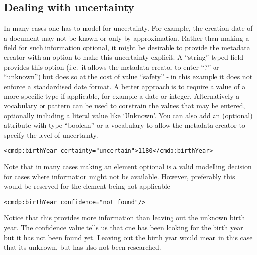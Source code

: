 \documentclass[]{article}
\date{}
\begin{document}
\subsection{Dealing with uncertainty}\label{dealing-with-uncertainty}

In many cases one has to model for uncertainty. For example, the
creation date of a document may not be known or only by approximation.
Rather than making a field for such information optional, it might be
desirable to provide the metadata creator with an option to make this
uncertainty explicit. A ``string'' typed field provides this option
(i.e.~it allows the metadata creator to enter ``?'' or ``unknown'') but
does so at the cost of value ``safety'' - in this example it does not
enforce a standardised date format. A better approach is to require a
value of a more specific type if applicable, for example a date or
integer. Alternatively a vocabulary or pattern can be used to constrain
the values that may be entered, optionally including a literal value
like `Unknown'. You can also add an (optional) attribute with type
``boolean'' or a vocabulary to allow the metadata creator to specify the
level of uncertainty.

\begin{verbatim}
<cmdp:birthYear certainty="uncertain">1180</cmdp:birthYear>
\end{verbatim}

Note that in many cases making an element optional is a valid modelling
decision for cases where information might not be available. However,
preferably this would be reserved for the element being not applicable.

\begin{verbatim}
<cmdp:birthYear confidence="not found"/>
\end{verbatim}

Notice that this provides more information than leaving out the unknown
birth year. The confidence value tells us that one has been looking for
the birth year but it has not been found yet. Leaving out the birth year
would mean in this case that its unknown, but has also not been
researched.
\end{document}
